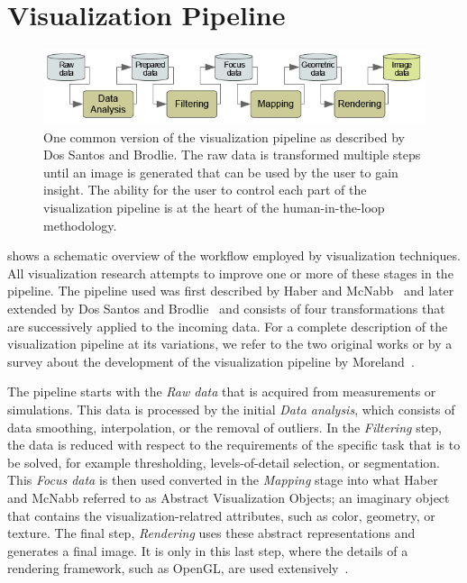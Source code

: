 \section{Visualization Pipeline} \label{cha:intro:vp}
\begin{figure}
  \centering
  \includegraphics[width=\textwidth]{figures/intro/pipeline.png}
  \caption{One common version of the visualization pipeline as described by Dos Santos and Brodlie. The raw data is transformed multiple steps until an image is generated that can be used by the user to gain insight.  The ability for the user to control each part of the visualization pipeline is at the heart of the human-in-the-loop methodology.}
  \label{fig:intro:vp}
\end{figure}

 shows a schematic overview of the workflow employed by visualization techniques.  All visualization research attempts to improve one or more of these stages in the pipeline.  The pipeline used was first described by Haber and McNabb~\cite{haber1990visualization} and later extended by Dos Santos and Brodlie~\cite{dos2004gaining} and consists of four transformations that are successively applied to the incoming data.  For a complete description of the visualization pipeline at its variations, we refer to the two original works or by a survey about the development of the visualization pipeline by Moreland~\cite{moreland2013survey}.

The pipeline starts with the \emph{Raw data} that is acquired from measurements or simulations.  This data is processed by the initial \emph{Data analysis}, which consists of data smoothing, interpolation, or the removal of outliers.  In the \emph{Filtering} step, the data is reduced with respect to the requirements of the specific task that is to be solved, for example thresholding, levels-of-detail selection, or segmentation.  This \emph{Focus data} is then used converted in the \emph{Mapping} stage into what Haber and McNabb referred to as Abstract Visualization Objects; an imaginary object that contains the visualization-relatred attributes, such as color, geometry, or texture.  The final step, \emph{Rendering} uses these abstract representations and generates a final image.  It is only in this last step, where the details of a rendering framework, such as OpenGL, are used extensively~\cite{segal2016opengl}.

